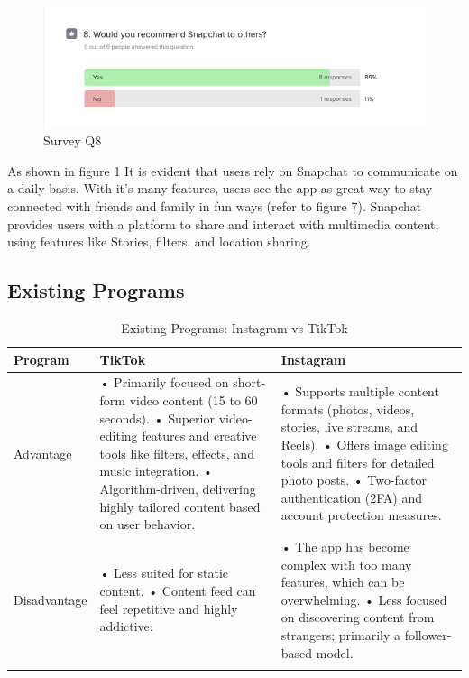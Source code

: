 \documentclass{article}
\begin{document}
\begin{figure}[h!]
    \centering
    \includegraphics[scale=0.6]{survey figure 8.png}
    \caption{Survey Q8}
    \label{fig:label}
\end{figure}
As shown in figure 1 It is evident that users rely on Snapchat to communicate on a daily basis. With it's many features, users see the app as great way to stay connected with friends and family in fun ways (refer to figure 7).
Snapchat provides users with a platform to share and interact with multimedia content, using features like Stories, filters, and location sharing.





\newpage
\subsection{Existing Programs}

\begin{longtable}{|p{2cm}|p{6cm}|p{6cm}|}
    \hline
    \textbf{Program} & \textbf{TikTok} & \textbf{Instagram} \\
    \hline
    Advantage & 
    • Primarily focused on short-form video content (15 to 60 seconds).\newline
    • Superior video-editing features and creative tools like filters, effects, and music integration.\newline
    • Algorithm-driven, delivering highly tailored content based on user behavior.\newline

    & 
    • Supports multiple content formats (photos, videos, stories, live streams, and Reels). \newline
    • Offers image editing tools and filters for detailed photo posts. \newline
    • Two-factor authentication (2FA) and account protection measures. \\
    \hline
    Disadvantage & 
    • Less suited for static content. \newline
    • Content feed can feel repetitive and highly addictive. 
    & 
    • The app has become complex with too many features, which can be overwhelming. \newline
    • Less focused on discovering content from strangers; primarily a follower-based model.\\
    \hline
    \caption{Existing Programs: Instagram vs TikTok}
    \label{tab:comparison}
\end{longtable}
\end{document}
